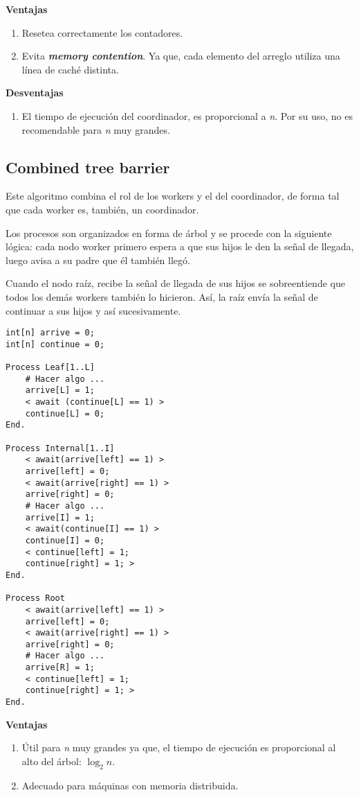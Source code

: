 \documentclass[a4paper, 10pt]{report}
\begin{document}
\textbf{Ventajas}
\begin{enumerate}
    \item Resetea correctamente los contadores.
    \item Evita \textbf{\emph{memory contention}}. Ya que, cada elemento del arreglo utiliza una línea de caché distinta.
\end{enumerate}

\textbf{Desventajas}
\begin{enumerate}
    \item El tiempo de ejecución del coordinador, es proporcional a \emph{n}. Por su uso, no es recomendable para \emph{n} muy grandes.
\end{enumerate}

\subsection{Combined tree barrier}
Este algoritmo combina el rol de los workers y el del coordinador, de forma tal que cada worker es, también, un coordinador.

Los procesos son organizados en forma de árbol y se procede con la siguiente lógica: cada nodo worker primero espera a que sus hijos le den la señal de llegada, luego avisa a su padre que él también llegó.

Cuando el nodo raíz, recibe la señal de llegada de sus hijos se sobreentiende que todos los demás workers también lo hicieron. Así, la raíz envía la señal de continuar a sus hijos y así sucesivamente.

\begin{lstlisting}[multicols=2]
int[n] arrive = 0;
int[n] continue = 0;
    
Process Leaf[1..L]
    # Hacer algo ...
    arrive[L] = 1;
    < await (continue[L] == 1) >
    continue[L] = 0;
End.
    
Process Internal[1..I]
    < await(arrive[left] == 1) >
    arrive[left] = 0;
    < await(arrive[right] == 1) >
    arrive[right] = 0;
    # Hacer algo ...
    arrive[I] = 1;
    < await(continue[I] == 1) >
    continue[I] = 0;
    < continue[left] = 1; 
    continue[right] = 1; >
End.
    
Process Root
    < await(arrive[left] == 1) >
    arrive[left] = 0;
    < await(arrive[right] == 1) >
    arrive[right] = 0;
    # Hacer algo ...
    arrive[R] = 1;
    < continue[left] = 1;
    continue[right] = 1; >
End.
\end{lstlisting}

\textbf{Ventajas}
\begin{enumerate}
    \item Útil para \emph{n} muy grandes ya que, el tiempo de ejecución es proporcional al alto del árbol: $\log_2n$.
    \item Adecuado para máquinas con memoria distribuida.
\end{enumerate}
\end{document}
